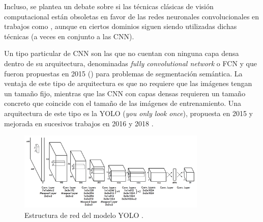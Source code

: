 Incluso, se plantea un debate sobre si las técnicas clásicas de visión computacional están obsoletas en favor de las redes neuronales convolucionales en trabajos como \cite{art:o2019deep}, aunque en ciertos dominios siguen siendo utilizadas dichas técnicas (a veces en conjunto a las CNN).

Un tipo particular de CNN son las que no cuentan con ninguna capa densa dentro de su arquitectura, denominadas \textit{fully convolutional network} o FCN y que fueron propuestas en 2015 (\citet{art:FCN2015}) para problemas de segmentación semántica. La ventaja de este tipo de arquitectura es que no requiere que las imágenes tengan un tamaño fijo, mientras que las CNN con capas densas requieren un tamaño concreto que coincide con el tamaño de las imágenes de entrenamiento. Una arquitectura de este tipo es la YOLO (\textit{you only look once}), propuesta en 2015 \cite{art:yolo} y mejorada en sucesivos trabajos en 2016 \cite{art:yolo2} y 2018 \cite{art:yolo3}.

\begin{figure}
  \centering
  \includegraphics[width=0.8\textwidth]{images/yolo.png}
  \caption{Estructura de red del modelo YOLO \cite{art:yolo}.}
  \label{fig:yoloArch}
\end{figure}

\newpage